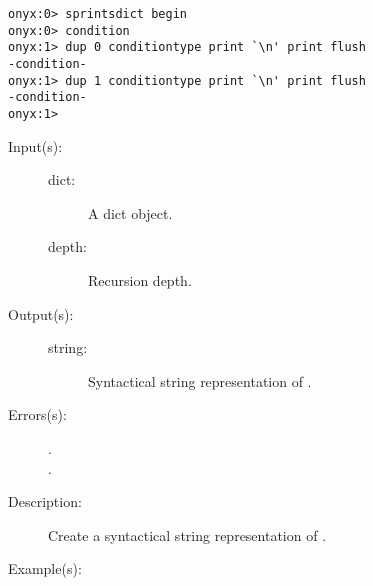 \begin{description}
\begin{description}
\begin{verbatim}
onyx:0> sprintsdict begin
onyx:0> condition
onyx:1> dup 0 conditiontype print `\n' print flush
-condition-
onyx:1> dup 1 conditiontype print `\n' print flush
-condition-
onyx:1>
		\end{verbatim}
	\end{description}
\label{sprintsdict:dicttype}
\item[{\onyxop{dict depth}{dicttype}{string}}: ]
	\begin{description}\item[]
	\item[Input(s): ]
		\begin{description}\item[]
		\item[dict: ]
			A dict object.
		\item[depth: ]
			Recursion depth.
		\end{description}
	\item[Output(s): ]
		\begin{description}\item[]
		\item[string: ]
			Syntactical string representation of .
		\end{description}
	\item[Errors(s): ]
		\begin{description}\item[]
		\item[.]
		\item[.]
		\end{description}
	\item[Description: ]
		Create a syntactical string representation of .
	\item[Example(s): ]\begin{verbatim}


\end{verbatim}
\end{description}
\end{description}
